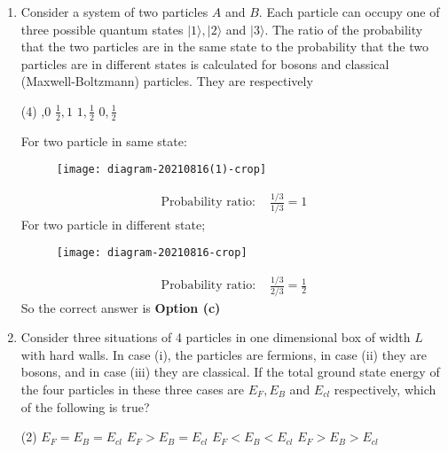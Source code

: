 \begin{enumerate}
	\item Consider a system of two particles $A$ and $B$. Each particle can occupy one of three possible quantum states $|1\rangle,|2\rangle$ and $|3\rangle$. The ratio of the probability that the two particles
	are in the same state to the probability that the two particles are in different states is calculated for bosons and classical (Maxwell-Boltzmann) particles. They are respectively
	{}
	
	\begin{tasks}(4)
		,0
		\task[\textbf{b.}]  $\frac{1}{2}, 1$
		\task[\textbf{c.}] $1, \frac{1}{2}$
		\task[\textbf{d.}] $0, \frac{1}{2}$
	\end{tasks}
	\begin{answer}
		For two particle in same state:\\
		\begin{figure}[H]
			\centering
			\texttt{[image: diagram-20210816(1)-crop]}
		\end{figure}
		\begin{align*}
		\text{Probability ratio: }&\frac{1 / 3}{1 / 3}=1
		\end{align*}
		For two particle in different state;
		\begin{figure}[H]
			\centering
			\texttt{[image: diagram-20210816-crop]}
		\end{figure}
		\begin{align*}
		\text{Probability ratio: }&\frac{1 / 3}{2 / 3}=\frac{1}{2}
		\end{align*}
		So the correct answer is \textbf{Option (c)}
	\end{answer}
	\item Consider three situations of 4 particles in one dimensional box of width $L$ with hard walls. In case (i), the particles are fermions, in case (ii) they are bosons, and in case (iii) they are classical. If the total ground state energy of the four particles in these three cases are $E_{F}, E_{B}$ and $E_{c l}$ respectively, which of the following is true?
	{\exyear{JEST 2013}}
	\begin{tasks}(2)
		\task[\textbf{a.}] $E_{F}=E_{B}=E_{c l}$
		\task[\textbf{b.}] $E_{F}>E_{B}=E_{c l}$
		\task[\textbf{c.}] $E_{F}<E_{B}<E_{c l}$
		\task[\textbf{d.}] $E_{F}>E_{B}>E_{c l}$
	\end{tasks}
	\begin{answer}
		\begin{align*}

\end{align*}
\end{answer}
\end{enumerate}
